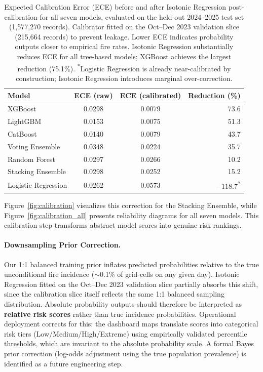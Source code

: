 \begin{table}[H]
\centering
\renewcommand{\arraystretch}{1.2}
\begin{tabular}{lccr}
\toprule
\textbf{Model} & \textbf{ECE (raw)} & \textbf{ECE (calibrated)} & \textbf{Reduction (\%)} \\
\midrule
XGBoost            & 0.0298 & 0.0079 & 73.6 \\
LightGBM           & 0.0153 & 0.0075 & 51.3 \\
CatBoost           & 0.0140 & 0.0079 & 43.7 \\
Voting Ensemble    & 0.0348 & 0.0224 & 35.7 \\
Random Forest      & 0.0297 & 0.0266 & 10.2 \\
Stacking Ensemble  & 0.0298 & 0.0252 & 15.2 \\
Logistic Regression& 0.0262 & 0.0573 & $-118.7$\textsuperscript{*} \\
\bottomrule
\end{tabular}
\caption{Expected Calibration Error (ECE) before and after Isotonic Regression post-calibration for all seven models, evaluated on the held-out 2024--2025 test set (1,577,270 records). Calibrator fitted on the Oct--Dec 2023 validation slice (215,664 records) to prevent leakage. Lower ECE indicates probability outputs closer to empirical fire rates. Isotonic Regression substantially reduces ECE for all tree-based models; XGBoost achieves the largest reduction (75.1\%). \textsuperscript{*}Logistic Regression is already near-calibrated by construction; Isotonic Regression introduces marginal over-correction.}
\label{tab:calibration}
\end{table}

Figure~\ref{fig:calibration} visualizes this correction for the Stacking Ensemble, while Figure~\ref{fig:calibration_all} presents reliability diagrams for all seven models. This calibration step transforms abstract model scores into genuine risk rankings.

\paragraph{Downsampling Prior Correction.} Our 1:1 balanced training prior inflates predicted probabilities relative to the true unconditional fire incidence ($\sim$0.1\% of grid-cells on any given day). Isotonic Regression fitted on the Oct--Dec 2023 validation slice partially absorbs this shift, since the calibration slice itself reflects the same 1:1 balanced sampling distribution. Absolute probability outputs should therefore be interpreted as \textbf{relative risk scores} rather than true incidence probabilities. Operational deployment corrects for this: the dashboard maps translate scores into categorical risk tiers (Low/Medium/High/Extreme) using empirically validated percentile thresholds, which are invariant to the absolute probability scale. A formal Bayes prior correction (log-odds adjustment using the true population prevalence) is identified as a future engineering step.

